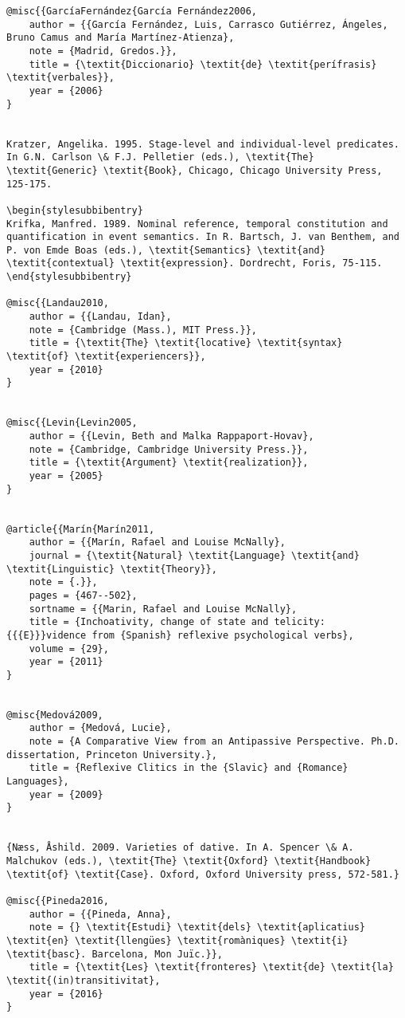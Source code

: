 \documentclass[output=paper,modfonts,nonflat]{langsci/langscibook}
\begin{document}
\begin{verbatim}
@misc{{GarcíaFernández{García Fernández2006,
	author = {{García Fernández, Luis, Carrasco Gutiérrez, Ángeles, Bruno Camus and María Martínez-Atienza},
	note = {Madrid, Gredos.}},
	title = {\textit{Diccionario} \textit{de} \textit{perífrasis} \textit{verbales}},
	year = {2006}
}


Kratzer, Angelika. 1995. Stage-level and individual-level predicates. In G.N. Carlson \& F.J. Pelletier (eds.), \textit{The} \textit{Generic} \textit{Book}, Chicago, Chicago University Press, 125-175.

\begin{stylesubbibentry}
Krifka, Manfred. 1989. Nominal reference, temporal constitution and quantification in event semantics. In R. Bartsch, J. van Benthem, and P. von Emde Boas (eds.), \textit{Semantics} \textit{and} \textit{contextual} \textit{expression}. Dordrecht, Foris, 75-115.
\end{stylesubbibentry}

@misc{{Landau2010,
	author = {{Landau, Idan},
	note = {Cambridge (Mass.), MIT Press.}},
	title = {\textit{The} \textit{locative} \textit{syntax} \textit{of} \textit{experiencers}},
	year = {2010}
}


@misc{{Levin{Levin2005,
	author = {{Levin, Beth and Malka Rappaport-Hovav},
	note = {Cambridge, Cambridge University Press.}},
	title = {\textit{Argument} \textit{realization}},
	year = {2005}
}


@article{{Marín{Marín2011,
	author = {{Marín, Rafael and Louise McNally},
	journal = {\textit{Natural} \textit{Language} \textit{and} \textit{Linguistic} \textit{Theory}},
	note = {.}},
	pages = {467--502},
	sortname = {{Marin, Rafael and Louise McNally},
	title = {Inchoativity, change of state and telicity: {{{E}}}vidence from {Spanish} reflexive psychological verbs},
	volume = {29},
	year = {2011}
}


@misc{Medová2009,
	author = {Medová, Lucie},
	note = {A Comparative View from an Antipassive Perspective. Ph.D. dissertation, Princeton University.},
	title = {Reflexive Clitics in the {Slavic} and {Romance} Languages},
	year = {2009}
}


{Næss, Åshild. 2009. Varieties of dative. In A. Spencer \& A. Malchukov (eds.), \textit{The} \textit{Oxford} \textit{Handbook} \textit{of} \textit{Case}. Oxford, Oxford University press, 572-581.}

@misc{{Pineda2016,
	author = {{Pineda, Anna},
	note = {} \textit{Estudi} \textit{dels} \textit{aplicatius} \textit{en} \textit{llengües} \textit{romàniques} \textit{i} \textit{basc}. Barcelona, Mon Juïc.}},
	title = {\textit{Les} \textit{fronteres} \textit{de} \textit{la} \textit{(in)transitivitat},
	year = {2016}
}



\end{verbatim}
\end{document}
